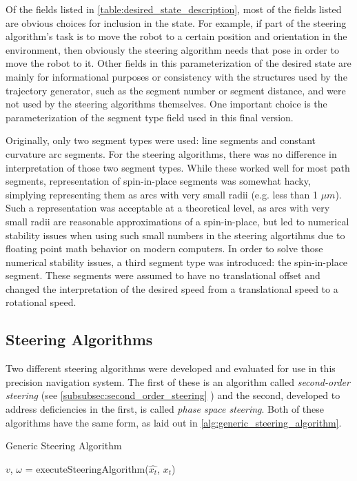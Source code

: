 Of the fields listed in \autoref{table:desired_state_description}, most of the fields listed are obvious choices for inclusion in the state. For example, if part of the steering algorithm's task is to move the robot to a certain position and orientation in the environment, then obviously the steering algorithm needs that pose in order to move the robot to it. Other fields in this parameterization of the desired state are mainly for informational purposes or consistency with the structures used by the trajectory generator, such as the segment number or segment distance, and were not used by the steering algorithms themselves. One important choice is the parameterization of the segment type field used in this final version.

Originally, only two segment types were used: line segments and constant curvature arc segments. For the steering algorithms, there was no difference in interpretation of those two segment types. While these worked well for most path segments, representation of spin-in-place segments was somewhat hacky, simplying representing them as arcs with very small radii (e.g. less than 1 $\mu m$). Such a representation was acceptable at a theoretical level, as arcs with very small radii are reasonable approximations of a spin-in-place, but led to numerical stability issues when using such small numbers in the steering algortihms due to floating point math behavior on modern computers. In order to solve those numerical stability issues, a third segment type was introduced: the spin-in-place segment. These segments were assumed to have no translational offset and changed the interpretation of the desired speed from a translational speed to a rotational speed.

\subsection{Steering Algorithms}\label{subsec:steering_algorithms}

Two different steering algorithms were developed and evaluated for use in this precision navigation system. The first of these is an algorithm called \emph{second-order steering} (see \autoref{subsubsec:second_order_steering} ) and the second, developed to address deficiencies in the first, is called \emph{phase space steering}. Both of these algorithms have the same form, as laid out in \autoref{alg:generic_steering_algorithm}.

\begin{algorithm}
\caption{Generic Steering Algorithm}
\label{alg:generic_steering_algorithm}
\DontPrintSemicolon


$v$, $\omega$ = executeSteeringAlgorithm($\hat{x_t}$, $x_t$)\;

\end{algorithm}

